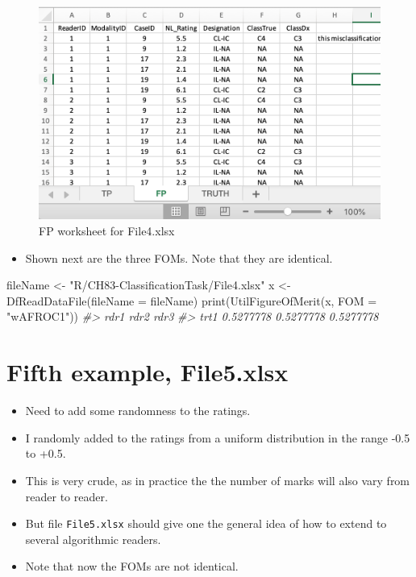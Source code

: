 \documentclass[
]{book}
\newenvironment{Shaded}{\begin{snugshade}}{\end{snugshade}}
\newcommand{\AttributeTok}[1]{\textcolor[rgb]{0.77,0.63,0.00}{#1}}
\newcommand{\CommentTok}[1]{\textcolor[rgb]{0.56,0.35,0.01}{\textit{#1}}}
\newcommand{\FunctionTok}[1]{\textcolor[rgb]{0.00,0.00,0.00}{#1}}
\newcommand{\NormalTok}[1]{#1}
\newcommand{\OtherTok}[1]{\textcolor[rgb]{0.56,0.35,0.01}{#1}}
\newcommand{\StringTok}[1]{\textcolor[rgb]{0.31,0.60,0.02}{#1}}
\providecommand{\tightlist}{%
  \setlength{\itemsep}{0pt}\setlength{\parskip}{0pt}}
\begin{document}
\begin{figure}

{\centering \includegraphics[width=0.5\linewidth,height=0.2\textheight]{images/classification/File4FP} 

}

\caption{FP worksheet for File4.xlsx}\label{fig:File4FP}
\end{figure}

\begin{itemize}
\tightlist
\item
  Shown next are the three FOMs. Note that they are identical.
\end{itemize}

\begin{Shaded}
\begin{Highlighting}[]
\NormalTok{fileName }\OtherTok{\textless{}{-}} \StringTok{"R/CH83{-}ClassificationTask/File4.xlsx"}
\NormalTok{x }\OtherTok{\textless{}{-}} \FunctionTok{DfReadDataFile}\NormalTok{(}\AttributeTok{fileName =}\NormalTok{ fileName)}
\FunctionTok{print}\NormalTok{(}\FunctionTok{UtilFigureOfMerit}\NormalTok{(x, }\AttributeTok{FOM =} \StringTok{"wAFROC1"}\NormalTok{))}
\CommentTok{\#\textgreater{}           rdr1      rdr2      rdr3}
\CommentTok{\#\textgreater{} trt1 0.5277778 0.5277778 0.5277778}
\end{Highlighting}
\end{Shaded}

\hypertarget{classification-tasks-example5}{%
\section{Fifth example, File5.xlsx}\label{classification-tasks-example5}}

\begin{itemize}
\tightlist
\item
  Need to add some randomness to the ratings.
\item
  I randomly added to the ratings from a uniform distribution in the range -0.5 to +0.5.
\item
  This is very crude, as in practice the the number of marks will also vary from reader to reader.
\item
  But file \texttt{File5.xlsx} should give one the general idea of how to extend to several algorithmic readers.
\item
  Note that now the FOMs are not identical.
\end{itemize}
\end{document}
